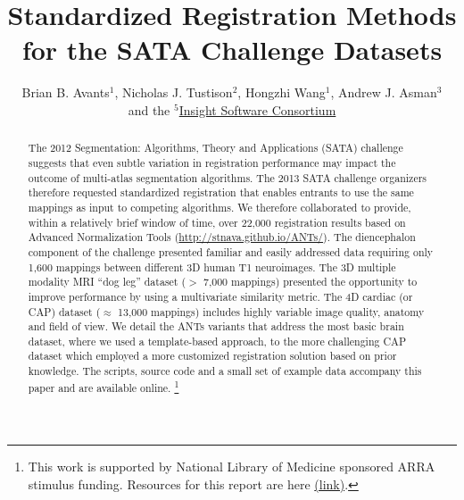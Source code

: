 \documentclass{llncs}
\begin{document}
\vspace{-0.1in}
\title{Standardized Registration Methods for the SATA Challenge Datasets}
\author{Brian B. Avants$^1$, Nicholas J. Tustison$^2$, Hongzhi
  Wang$^1$, Andrew J. Asman$^3$ \\and the
  $^5$\href{http://www.insightsoftwareconsortium.org/}{Insight
    Software Consortium}}
\maketitle              
\begin{abstract}
The 2012 Segmentation: Algorithms, Theory and Applications (SATA)
challenge suggests that even subtle variation in registration
performance may impact the outcome of multi-atlas segmentation
algorithms. The 2013 SATA challenge organizers therefore requested
standardized registration that enables entrants to use the same
mappings as input to competing algorithms.  We therefore collaborated
to provide, within a relatively brief window of time, over 22,000
registration results based on Advanced Normalization Tools
(\url{http://stnava.github.io/ANTs/}).
The diencephalon component of the challenge presented familiar and
easily addressed data requiring only 1,600 mappings between different
3D human T1 neuroimages.  The 3D multiple modality MRI ``dog leg'' dataset ($>$ 7,000
mappings) presented the opportunity to improve performance by using
a multivariate similarity metric.  The 4D cardiac (or CAP) dataset
($\approx$ 13,000 mappings) includes highly variable image quality, anatomy
and field of view.  We detail the ANTs variants that address the most basic brain dataset, where we used
a template-based approach, to the more challenging CAP dataset which
employed a more customized registration solution based on prior
knowledge.  The scripts, source code and a small set of example data
accompany this paper and are available online.  
\footnote{This work is supported by National Library of Medicine sponsored ARRA stimulus
funding. Resources for this report are here \href{https://github.com/stnava/KnobSock}{(link)}.}
\end{abstract}
\end{document}
